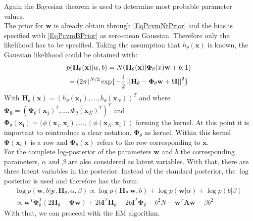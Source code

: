 Again the Bayesian theorem is used to determine most probable parameter values.\cite{Chen.2009}\\
The prior for $\mathbf{w}$ is already obtain through \ref{EqPcvmNtPrior} and the bias is specified with \eqref{EqPcvmBPrior} as zero-mean Gaussian. Therefore only the likelihood has to be specified.
Taking the assumption that $h_\theta (\mathbf{x})$ is known, the Gaussian likelihood could be obtained with:\cite{Chen.2009}
\begin{equation}\label{EqPcGausLike}
\begin{gathered}
p(\mathbf{H}_\theta(\mathbf{x})\vert w,b) = N(\mathbf{H}_\theta(\mathbf{x})\vert \mathbf{\Phi}_\theta(x)\mathbf{w}+b,1)\\
= (2\pi)^{N/2}\exp\{-\frac{1}{2} \left\vert\left\vert\mathbf{H}_{\theta} - \mathbf{\Phi}_{\theta}\mathbf{w}+b\mathbf{I}\right\vert\right\vert^2 \}
\end{gathered}
\end{equation}
With $\mathbf{H}_\theta(\mathbf{x}) = (h_\theta(\mathbf{x}_1),\dots,h_\theta(\mathbf{x}_N))^T$ and where $\mathbf{\Phi_\theta} = (\mathbf{\Phi}_\theta(\mathbf{x}_1)^T,\dots,\Phi_\theta(\mathbf{x}_N)^T)^T$ and $\mathbf{\Phi}_\theta(\mathbf{x_i}) = (\phi(\mathbf{x}_1,\mathbf{x}_i),\dots,(\phi(\mathbf{x}_N,\mathbf{x}_i))$ forming the kernel.
At this point it is important to reintroduce a clear notation.
$\mathbf{\Phi}_\theta$ as kernel. Within this kernel $\mathbf{\Phi}(\mathbf{x}_i)$ is a row and $\mathbf{\Phi}_\theta(\mathbf{x})$ refers to the row corresponding to $\mathbf{x}$.\\
For the complete log-posterior of the parameters $\mathbf{w}$ and $b$ the corresponding parameters, $\alpha$ and $\beta$ are also considered as latent variables.
With that, there are three latent variables in the posterior.
Instead of the standard posterior, the $\log$ posterior is used and therefore has the form:\cite{Chen.2009}
\begin{equation}\label{EqPcvmInf}
\begin{gathered}
\log p(\mathbf{w},b\vert \mathbf{y},\mathbf{H}_\theta,\alpha,\beta) \propto \log p(\mathbf{H}_\theta \vert \mathbf{w},b) + \log p(\mathbf{w}\vert \alpha) + \log p(b\vert \beta)\\
\propto \mathbf{w}^T\mathbf{\Phi}_\theta^T(2\mathbf{H}_\theta - \mathbf{\Phi}\mathbf{w})+2b\mathbf{I}^T\mathbf{H}_\theta - 2b\mathbf{I}^T\mathbf{\Phi}_\theta - b^2N - \mathbf{w}^T\mathbf{Aw}-\beta b^2
\end{gathered}
\end{equation}
With that, we can proceed with the \acs{EM} algorithm.\cite{Chen.2009}\\
